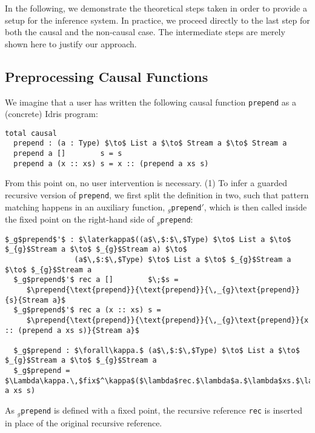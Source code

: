 In the following, we demonstrate the theoretical steps taken in order to provide
a setup for the inference system. In practice, we proceed directly to the last
step for both the causal and the non-causal case. The intermediate steps are
merely shown here to justify our approach.

\subsection{Preprocessing Causal Functions}
\label{sec:prepr-caus-funct}
 We imagine that a user has written the following causal function
 \texttt{prepend} as a (concrete) Idris program:
\begin{lstlisting}[mathescape, title=\idrisBlock]
  total causal
  prepend : (a : Type) $\to$ List a $\to$ Stream a $\to$ Stream a
  prepend a []        s = s
  prepend a (x :: xs) s = x :: (prepend a xs s)
\end{lstlisting}
 From this point on, no user intervention is necessary.  (1) To infer a guarded
 recursive version of \texttt{prepend}, we first split the definition in
 two, such that pattern matching happens in an auxiliary function,
 \texttt{$_g$prepend$'$}, which is then called inside the fixed point on the
 right-hand side of \texttt{$_g$prepend}:

\begin{lstlisting}[mathescape, title=\ttBlock]
  $_g$prepend$'$ : $\laterkappa$((a$\,$:$\,$Type) $\to$ List a $\to$ $_{g}$Stream a $\to$ $_{g}$Stream a) $\to$ 
                (a$\,$:$\,$Type) $\to$ List a $\to$ $_{g}$Stream a $\to$ $_{g}$Stream a
  $_g$prepend$'$ rec a []        $\;$s = 
     $\prepend{\text{prepend}}{\text{prepend}}{\,_{g}\text{prepend}}{s}{Stream a}$
  $_g$prepend$'$ rec a (x :: xs) s = 
     $\prepend{\text{prepend}}{\text{prepend}}{\,_{g}\text{prepend}}{x :: (prepend a xs s)}{Stream a}$

  $_g$prepend : $\forall\kappa.$ (a$\,$:$\,$Type) $\to$ List a $\to$ $_{g}$Stream a $\to$ $_{g}$Stream a
  $_g$prepend = $\Lambda\kappa.\,$fix$^\kappa$($\lambda$rec.$\lambda$a.$\lambda$xs.$\lambda$s.$\,$$_g$prepend$'\;$rec a xs s)
\end{lstlisting}
As \texttt{$_g$prepend} is defined with a fixed point, the recursive reference
\texttt{rec} is inserted in place of the original recursive reference.

